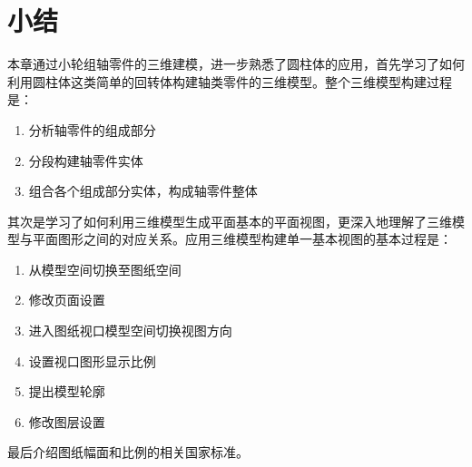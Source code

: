 \section{小结}
本章通过小轮组轴零件的三维建模，进一步熟悉了圆柱体的应用，首先学习了如何利用圆柱体这类简单的回转体构建轴类零件的三维模型。整个三维模型构建过程是：
\begin{enumerate}
\item 分析轴零件的组成部分
\item 分段构建轴零件实体
\item 组合各个组成部分实体，构成轴零件整体
\end{enumerate} 

其次是学习了如何利用三维模型生成平面基本的平面视图，更深入地理解了三维模型与平面图形之间的对应关系。应用三维模型构建单一基本视图的基本过程是：
\begin{enumerate}
\item 从模型空间切换至图纸空间
\item 修改页面设置
\item 进入图纸视口模型空间切换视图方向
\item 设置视口图形显示比例
\item 提出模型轮廓
\item 修改图层设置
\end{enumerate}

最后介绍图纸幅面和比例的相关国家标准。
\endinput